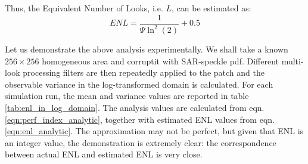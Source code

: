 \documentclass[journal]{IEEEtran}
\begin{document}
Thus, the Equivalent Number of Looks, i.e. $L$, can be estimated as:
\begin{equation}
ENL = \frac{1}{\Psi \ln^2(2)} + 0.5
\label{eqn:enl_analytic}
\end{equation}

Let us demonstrate the above analysis experimentally.
We shall take a known $256\times256$ homogeneous area and corruptit with SAR-speckle pdf. Different multi-look processing filters are then repeatedly applied to the patch and the observable variance in the log-transformed domain is calculated. 
For each simulation run, the mean and variance values are reported in table \ref{tab:enl_in_log_domain}. 
The analysis values are calculated from eqn. \ref{eqn:perf_index_analytic}, together with estimated ENL values from eqn. \ref{eqn:enl_analytic}.
The approximation may not be perfect, but given that ENL is an integer value, the demonstration is extremely clear: the correspondence between actual ENL and estimated ENL is very close.

\end{document}
